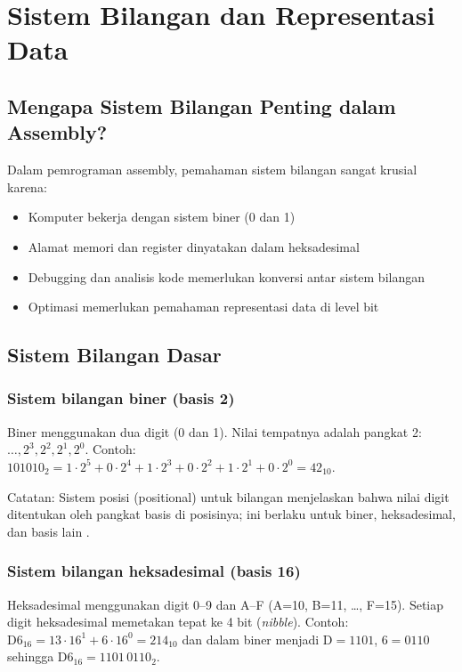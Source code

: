 \documentclass[../main.tex]{subfiles}
\begin{document}
\section{Sistem Bilangan dan Representasi Data}\label{sec:pengenalan-sistem-bilangan}

\subsection{Mengapa Sistem Bilangan Penting dalam Assembly?}
Dalam pemrograman assembly, pemahaman sistem bilangan sangat krusial karena:
\begin{itemize}
    \item Komputer bekerja dengan sistem biner (0 dan 1)
    \item Alamat memori dan register dinyatakan dalam heksadesimal
    \item Debugging dan analisis kode memerlukan konversi antar sistem bilangan
    \item Optimasi memerlukan pemahaman representasi data di level bit
\end{itemize}

\subsection{Sistem Bilangan Dasar}\label{subsec:pengenalan-dasar-bilangan}

\subsubsection{Sistem bilangan biner (basis 2)}
Biner menggunakan dua digit (0 dan 1). Nilai tempatnya adalah pangkat 2: \(\ldots, 2^3, 2^2, 2^1, 2^0\). Contoh: \(101010_2 = 1\cdot 2^5 + 0\cdot 2^4 + 1\cdot 2^3 + 0\cdot 2^2 + 1\cdot 2^1 + 0\cdot 2^0 = 42_{10}\).

Catatan: Sistem posisi (positional) untuk bilangan menjelaskan bahwa nilai digit ditentukan oleh pangkat basis di posisinya; ini berlaku untuk biner, heksadesimal, dan basis lain \cite{wiki_binary_number,wiki_positional_numeral_system}.

\subsubsection{Sistem bilangan heksadesimal (basis 16)}
Heksadesimal menggunakan digit 0--9 dan A--F (A=10, B=11, \ldots, F=15). Setiap digit heksadesimal memetakan tepat ke 4 bit (\textit{nibble}). Contoh: \(\mathrm{D6}_{16} = 13\cdot 16^1 + 6\cdot 16^0 = 214_{10}\) dan dalam biner menjadi \(\mathrm{D} = 1101\), \(6 = 0110\) sehingga \(\mathrm{D6}_{16} = 1101\,0110_2\).
\end{document}
